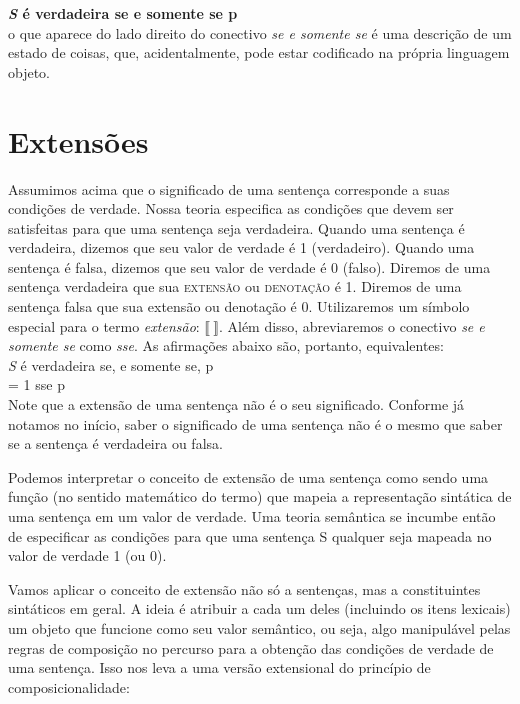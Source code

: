 \n \textbf{\textit{S} é verdadeira se e somente se
p}\\

\n o que aparece do lado direito do conectivo \textit{se e somente
se} é uma descri\-ção de um estado de coisas, que,
acidentalmente, pode estar codificado na própria
linguagem objeto.

\section{Extensões}

Assumimos acima que o significado de uma sentença corresponde a
suas condi\-çõ\-es de verdade. Nossa teoria especifica as
condi\-çõ\-es que devem ser satisfeitas para que uma sentença seja
verdadeira. Quando uma sentença é verdadeira, dizemos que seu
valor de verdade é 1 (verdadeiro). Quando uma sentença é falsa,
dizemos que seu valor de verdade é 0 (falso). Diremos de uma
sentença verdadeira que sua \textsc{extensão} ou
\textsc{denotação} é 1. Diremos de uma sentença falsa
que sua extensão ou denota\-ção é 0. Utilizaremos um símbolo
especial para o termo \textit{extensão}: $\llbracket \ \rrbracket$. Além
disso, abreviaremos o conectivo \textit{se e somente se} como
\textit{sse}. As afirma\-çõ\-es abaixo são, portanto,
equivalentes:\\

\noindent \textit{S} é verdadeira se, e somente se, p\\

\noindent {} = 1 sse p\\

\noindent Note que a extensão de uma sentença não é o seu
significado. Conforme já notamos no início, saber o significado de
uma sentença não é o mesmo que saber se a sentença é verdadeira ou
falsa.

Podemos interpretar o conceito de extensão de uma sentença como
sendo uma fun\-ção (no sentido matemático do termo) que mapeia a
representa\-ção sintática de uma sentença em um valor de verdade.
Uma teoria semântica se incumbe então de especificar as
condi\-çõ\-es para que uma sentença S qualquer seja mapeada no
valor de verdade 1 (ou 0).

Vamos aplicar o conceito de extensão não só a sen\-ten\-ças, mas a
constituintes sintáticos em geral. A ideia é atribuir a cada um
deles (incluindo os itens lexicais) um objeto que funcione como
seu valor semântico, ou seja, algo manipulável pelas regras de
composi\-ção no percurso para a obten\-ção das condi\-çõ\-es de
verdade de uma sentença. Isso nos leva a uma versão extensional do
prin\-cí\-pio
de composicionalidade:\\

